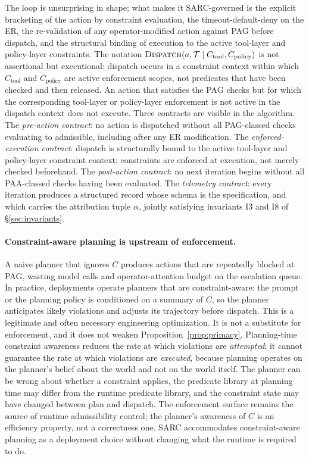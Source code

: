 \documentclass[11pt,a4paper]{article}
\theoremstyle{remark}
\begin{document}
The loop is unsurprising in shape; what makes it SARC-governed is the explicit bracketing of the action by constraint evaluation, the timeout-default-deny on the ER, the re-validation of any operator-modified action against PAG before dispatch, and the structural binding of execution to the active tool-layer and policy-layer constraints. The notation $\textsc{Dispatch}(a, \mathcal{T} \mid C_{\text{tool}}, C_{\text{policy}})$ is not assertional but executional: dispatch occurs in a constraint context within which $C_{\text{tool}}$ and $C_{\text{policy}}$ are active enforcement scopes, not predicates that have been checked and then released. An action that satisfies the PAG checks but for which the corresponding tool-layer or policy-layer enforcement is not active in the dispatch context does not execute. Three contracts are visible in the algorithm. The \emph{pre-action contract}: no action is dispatched without all PAG-classed checks evaluating to admissible, including after any ER modification. The \emph{enforced-execution contract}: dispatch is structurally bound to the active tool-layer and policy-layer constraint context; constraints are enforced at execution, not merely checked beforehand. The \emph{post-action contract}: no next iteration begins without all PAA-classed checks having been evaluated. The \emph{telemetry contract}: every iteration produces a structured record whose schema is the specification, and which carries the attribution tuple $\alpha$, jointly satisfying invariants I3 and I8 of \S\ref{sec:invariants}.

\paragraph{Constraint-aware planning is upstream of enforcement.} A naive planner that ignores $C$ produces actions that are repeatedly blocked at PAG, wasting model calls and operator-attention budget on the escalation queue. In practice, deployments operate planners that are constraint-aware: the prompt or the planning policy is conditioned on a summary of $C$, so the planner anticipates likely violations and adjusts its trajectory before dispatch. This is a legitimate and often necessary engineering optimization. It is not a substitute for enforcement, and it does not weaken Proposition~\ref{prop:primacy}. Planning-time constraint awareness reduces the rate at which violations are \emph{attempted}; it cannot guarantee the rate at which violations are \emph{executed}, because planning operates on the planner's belief about the world and not on the world itself. The planner can be wrong about whether a constraint applies, the predicate library at planning time may differ from the runtime predicate library, and the constraint state may have changed between plan and dispatch. The enforcement surface remains the source of runtime admissibility control; the planner's awareness of $C$ is an efficiency property, not a correctness one. SARC accommodates constraint-aware planning as a deployment choice without changing what the runtime is required to do.
\end{document}
